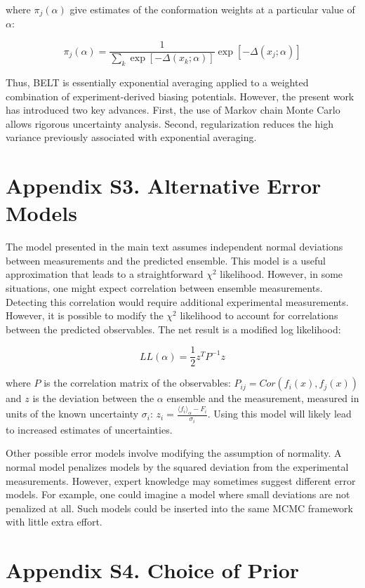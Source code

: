 \documentclass[12pt]{article}
\begin{document}
where $\pi_j(\alpha)$ give estimates of the conformation weights at a particular value of $\alpha$:

$$\pi_j(\alpha) = \frac{1}{\sum_k \exp[-\Delta(x_k;\alpha)]} \exp[-\Delta(x_j;\alpha)]$$

Thus, BELT is essentially exponential averaging applied to a weighted combination of experiment-derived biasing potentials.  However, the present work has introduced two key advances.  First, the use of Markov chain Monte Carlo allows rigorous uncertainty analysis.  Second, regularization reduces the high variance previously associated with exponential averaging.  

\newpage

\section*{Appendix S3.  Alternative Error Models}

The model presented in the main text assumes independent normal deviations between measurements and the predicted ensemble.  This model is a useful approximation that leads to a straightforward $\chi^2$ likelihood.  However, in some situations, one might expect correlation between ensemble measurements.  Detecting this correlation would require additional experimental measurements.  However, it is possible to modify the $\chi^2$ likelihood to account for correlations between the predicted observables.  The net result is a modified log likelihood:

$$L L(\alpha) = \frac{1}{2} z^T P^{-1} z$$

where $P$ is the correlation matrix of the observables: $P_{ij} = Cor(f_i(x), f_j(x))$ and $z$ is the deviation between the $\alpha$ ensemble and the measurement, measured in units of the known uncertainty $\sigma_i$: $z_i = \frac{\langle f_i\rangle _\alpha - F_i}{\sigma_i}$.  Using this model will likely lead to increased estimates of uncertainties.  

Other possible error models involve modifying the assumption of normality.  A normal model penalizes models by the squared deviation from the experimental measurements.  However, expert knowledge may sometimes suggest different error models.  For example, one could imagine a model where small deviations are not penalized at all.  Such models could be inserted into the same MCMC framework with little extra effort.

\newpage

\section*{Appendix S4.  Choice of Prior}
\end{document}
